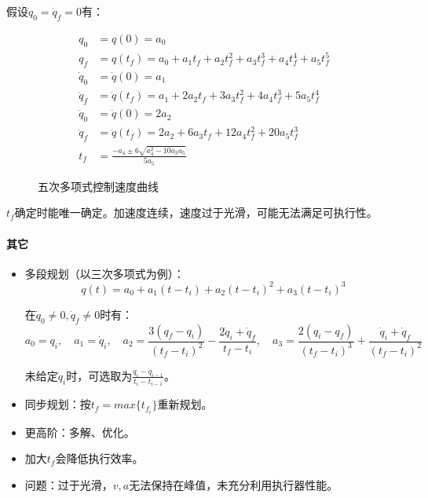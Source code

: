 \documentclass[
12pt, %
a4paper, 
oneside, %
headinclude,footinclude, %
]{scrartcl}
\begin{document}
假设$ \dot{q}_0 = \dot{q}_f = 0 $有： \\
\begin{minipage}{0.4\textwidth}
\begin{align*} 
q_0 &= q(0) = a_0 \\ 
q_f &= q(t_f) = a_0 + a_1 t_f + a_2 t_f^2 + a_3 t_f^3 + a_4 t_f^4 + a_5 t_f^5 \\
\dot{q}_0 &= \dot{q}(0) = a_1 \\
 \dot{q}_f &=\dot{q}(t_f) = a_1 + 2 a_2 t_f + 3 a_3 t_f^2 + 4 a_4 t_f^3 + 5 a_5 t_f^4 \\
\ddot{q}_0 &= \ddot{q}(0) = 2a_2 \\
\ddot{q}_f &= \ddot{q}(t_f) = 2 a_2 + 6 a_3 t_f + 12 a_4 t_f^2 + 20 a_5 t_f^3 \\
t_f &= \frac{-a_4 \pm 6 \sqrt{a_4^2 - 10 a_3 a_5}}{5a_5}
\end{align*}
\end{minipage}
\hfill
\begin{minipage}{0.4\textwidth}
\begin{figure}[H]
\centering
{}
\caption{五次多项式控制速度曲线}
\end{figure}
\end{minipage}

$ t_f $确定时能唯一确定。加速度连续，速度过于光滑，可能无法满足可执行性。
\paragraph{其它}
\begin{itemize}
\item 多段规划（以三次多项式为例）：
$$ q(t) = a_0 + a_1(t - t_i) + a_2(t - t_i)^2 + a_3(t - t_i)^3 $$

在$ \dot{q}_0 \neq 0, \dot{q}_f \neq 0 $时有：
$$ a_0 = q_i, \quad a_1 = \dot{q}_i, \quad a_2 = \frac{3(q_f - q_i)}{(t_f - t_i)^2} - \frac{2\dot{q}_i + \dot{q}_f}{t_f - t_i}, \quad a_3 = \frac{2(q_i - q_f)}{(t_f - t_i)^3} + \frac{\dot{q}_i + \dot{q}_f}{(t_f - t_i)^2} $$

未给定$ \dot{q}_i $时，可选取为$ \frac{q_i - q_{i - 1}}{t_i - t_{i - 1}} $。
\item 同步规划：按$ t_f = max\{t_{f_i}\} $重新规划。
\item 更高阶：多解、优化。
\item 加大$ t_f $会降低执行效率。
\item 问题：过于光滑，$ v, a $无法保持在峰值，未充分利用执行器性能。
\end{itemize}
\end{document}
